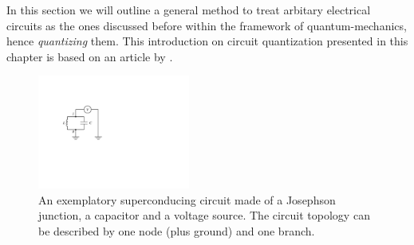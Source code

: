 In this section we will outline a general method to treat arbitary electrical circuits as the ones discussed before within the framework of quantum-mechanics, hence {\it quantizing} them. This introduction on circuit quantization presented in this chapter is based on an article by \cite{devoret_quantum_1995}.

\begin{figure}
	\includegraphics[width=5cm]{"./material/figures/introduction/sample_circuit"}
	\caption{An exemplatory superconducing circuit made of a Josephson junction, a capacitor and a voltage source. The circuit topology can be described by one node (plus ground) and one branch.}
	\label{fig:SampleCircuit}
\end{figure}

